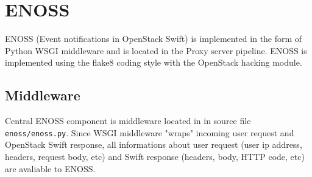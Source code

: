 \section{ENOSS}
    ENOSS (Event notifications in OpenStack Swift) is implemented in the form of Python WSGI middleware and is located in the Proxy server pipeline. ENOSS is implemented using the flake8 coding style with the OpenStack hacking module.

    \subsection{Middleware}\label{sec:enoss-swift-section}
    Central ENOSS component is middleware located in in source file \texttt{enoss/enoss.py}. Since WSGI middleware "wraps" incoming user request and OpenStack Swift response, all informations about user request (user ip address, headers, request body, etc) and Swift response (headers, body, HTTP code, etc) are avaliable to ENOSS.

